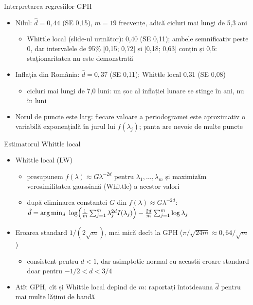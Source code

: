 \begin{frame}{Interpretarea regresiilor GPH}
\itemsize{\small}
\begin{itemize}
    \item Nilul: $\hat d = 0{,}44$ (SE 0{,}15), $m = 19$ frecvențe, adică cicluri mai lungi de 5{,}3 ani
    \begin{itemize}
        \item Whittle local (slide-ul următor): 0{,}40 (SE 0{,}11); ambele semnificativ peste 0, dar intervalele de 95\% [0{,}15; 0{,}72] și [0{,}18; 0{,}63] conțin și 0,5: staționaritatea nu este demonstrată
    \end{itemize}
    \item Inflația din România: $\hat d = 0{,}37$ (SE 0{,}11); Whittle local 0{,}31 (SE 0{,}08)
    \begin{itemize}
        \item cicluri mai lungi de 7{,}0 luni: un șoc al inflației lunare se stinge în ani, nu în luni
    \end{itemize}
    \item Norul de puncte este larg: fiecare valoare a periodogramei este aproximativ o variabilă exponențială în jurul lui $f(\lambda_j)$; panta are nevoie de multe puncte
\end{itemize}
\end{frame}

\begin{frame}{Estimatorul Whittle local}
\itemsize{\small}
\begin{itemize}
    \item Whittle local (LW) 
    \begin{itemize}
        \item presupunem $f(\lambda) \approx G\lambda^{-2d}$ pentru $\lambda_1, \dots, \lambda_m$ și maximizăm verosimilitatea gaussiană (Whittle) a acestor valori
        \item după eliminarea constantei $G$ din $f(\lambda) \approx G\lambda^{-2d}$: $\hat d = \arg\min_d\ \log\Bigl(\frac1m\sum_{j=1}^m \lambda_j^{2d}I(\lambda_j)\Bigr) - \frac{2d}{m}\sum_{j=1}^m\log\lambda_j$
    \end{itemize}
    \item Eroarea standard $1/(2\sqrt m)$, mai mică decît la GPH ($\pi/\sqrt{24m} \approx 0{,}64/\sqrt m$)
    \begin{itemize}
        \item consistent pentru $d < 1$, dar asimptotic normal cu această eroare standard doar pentru $-1/2 < d < 3/4$ 
    \end{itemize}
    \item Atît GPH, cît și Whittle local depind de $m$: raportați întotdeauna $\hat d$ pentru mai multe lățimi de bandă
\end{itemize}
\end{frame}

